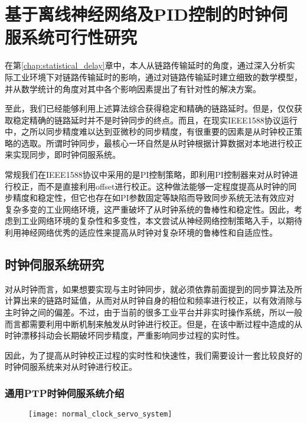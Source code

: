 
\chapter{基于离线神经网络及PID控制的时钟伺服系统可行性研究}
在第\ref{chap:statistical_delay}章中，本人从链路传输延时的角度，通过深入分析实际工业环境下对链路传输延时的影响，通过对链路传输延时建立细致的数学模型，并从数学统计的角度对其中各个影响因素提出了有针对性的解决方案。

至此，我们已经能够利用上述算法综合获得稳定和精确的链路延时。但是，仅仅获取稳定精确的链路延时并不是时钟同步的终点。而且，在现实IEEE1588协议运行中，之所以同步精度难以达到亚微秒的同步精度，有很重要的因素是从时钟校正策略的选取。所谓时钟同步，最核心一环自然是从时钟根据计算数据对本地进行校正来实现同步，即时钟伺服系统。

常规我们在IEEE1588协议中采用的是PI控制策略，即利用PI控制器来对从时钟进行校正，而不是直接利用offset进行校正。这种做法能够一定程度提高从时钟的同步精度和稳定性，但它也存在如PI参数固定等缺陷而导致同步系统无法有效应对复杂多变的工业网络环境，这严重破坏了从时钟系统的鲁棒性和稳定性。因此，考虑到工业网络环境的复杂性和多变性，本文尝试从神经网络控制策略入手，以期待利用神经网络优秀的适应性来提高从时钟对复杂环境的鲁棒性和自适应性。

\section{时钟伺服系统研究}
对从时钟而言，如果想要实现与主时钟同步，就必须依靠前面提到的同步算法及所计算出来的链路时延值，从而对从时钟自身的相位和频率进行校正，以有效消除与主时钟之间的偏差。不过，由于当前的很多工业平台并非实时操作系统，所以一般而言都需要利用中断机制来触发从时钟进行校正。但是，在该中断过程中造成的从时钟漂移抖动会长期破坏同步精度，严重影响同步过程的实时性。

因此，为了提高从时钟校正过程的实时性和快速性，我们需要设计一套比较良好的时钟伺服系统来对从时钟进行校正。

\subsection{通用PTP时钟伺服系统介绍}

\begin{figure}[!hbp]
  \centering
  \begin{minipage}[b]{0.7\textwidth}
    \captionstyle{\centering}
    \centering
    \texttt{[image: normal\_clock\_servo\_system]}
  \end{minipage}     
\end{figure}

